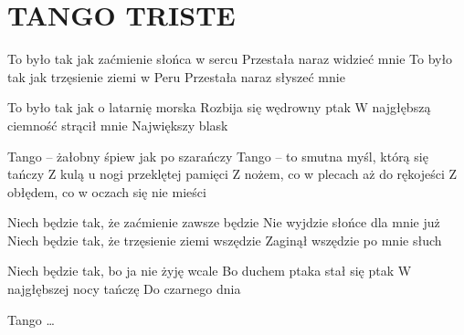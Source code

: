 \documentclass[../../../songbook.tex]{subfiles}
\begin{document}
\TabPositions{8cm} %
\section*{TANGO TRISTE}
\vspace{0.5cm}
To było tak jak zaćmienie słońca w sercu		 \newline    
Przestała naraz widzieć mnie					 \newline                    
To było tak jak trzęsienie ziemi w Peru			 \newline    
Przestała naraz słyszeć mnie					 \newline                     

To było tak jak o latarnię morska    	\newline                  
Rozbija się wędrowny ptak                \newline   	              
W najgłębszą ciemność strącił mnie       \newline           
Największy blask                         \newline                        

\-\hspace{1cm}Tango – żałobny śpiew jak po szarańczy	 \newline            
\-\hspace{1cm}Tango – to smutna myśl, którą się tańczy	      \newline    
\-\hspace{1cm}Z kulą u nogi przeklętej pamięci			    \newline                 
\-\hspace{1cm}Z nożem, co w plecach aż do rękojeści 		  \newline          
\-\hspace{1cm}Z obłędem, co w oczach się nie mieści		 \newline       

Niech będzie tak, że zaćmienie zawsze będzie        \newline 
Nie wyjdzie słońce dla mnie już                       \newline            
Niech będzie tak, że trzęsienie ziemi wszędzie       \newline 
Zaginął wszędzie po mnie słuch                       \newline     

Niech będzie tak, bo ja nie żyję wcale              \newline   
Bo duchem ptaka stał się ptak                    \newline        
W najgłębszej nocy tańczę                       \newline             
Do czarnego dnia                                \newline                  

\-\hspace{1cm}Tango …
\end{document}
